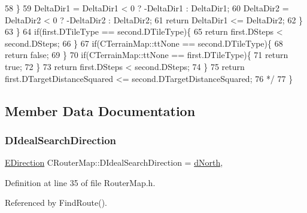 \begin{DoxyCode}
58 \textcolor{comment}{                \}}
59 \textcolor{comment}{                DeltaDir1 = DeltaDir1 < 0 ? -DeltaDir1 : DeltaDir1;}
60 \textcolor{comment}{                DeltaDir2 = DeltaDir2 < 0 ? -DeltaDir2 : DeltaDir2;}
61 \textcolor{comment}{                return DeltaDir1 <= DeltaDir2; }
62 \textcolor{comment}{            \}}
63 \textcolor{comment}{        \}}
64 \textcolor{comment}{        if(first.DTileType == second.DTileType)\{}
65 \textcolor{comment}{            return first.DSteps < second.DSteps;}
66 \textcolor{comment}{        \}}
67 \textcolor{comment}{        if(CTerrainMap::ttNone == second.DTileType)\{}
68 \textcolor{comment}{            return false;   }
69 \textcolor{comment}{        \}}
70 \textcolor{comment}{        if(CTerrainMap::ttNone == first.DTileType)\{}
71 \textcolor{comment}{            return true;   }
72 \textcolor{comment}{        \}}
73 \textcolor{comment}{        return first.DSteps < second.DSteps;}
74 \textcolor{comment}{    \}}
75 \textcolor{comment}{    return first.DTargetDistanceSquared <= second.DTargetDistanceSquared;}
76 \textcolor{comment}{*/}
77 \}
\end{DoxyCode}


\subsection{Member Data Documentation}
\hypertarget{classCRouterMap_addf4151d25670daf5cb45058e978fde2}{}\label{classCRouterMap_addf4151d25670daf5cb45058e978fde2} 
\subsubsection{\texorpdfstring{D\+Ideal\+Search\+Direction}{DIdealSearchDirection}}
{\footnotesize\ttfamily \hyperlink{GameDataTypes_8h_acb2b033915f6659a71a38b5aa6e4eb42}{E\+Direction} C\+Router\+Map\+::\+D\+Ideal\+Search\+Direction = \hyperlink{GameDataTypes_8h_acb2b033915f6659a71a38b5aa6e4eb42a74d0139aee571cee88ff1393bbc6999e}{d\+North}\hspace{0.3cm}{\ttfamily [static]}, {\ttfamily [protected]}}



Definition at line 35 of file Router\+Map.\+h.



Referenced by Find\+Route().

